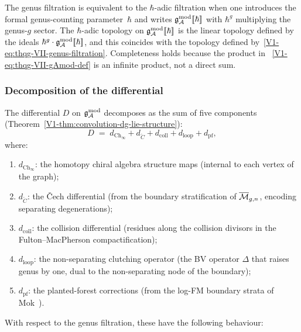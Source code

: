 \begin{remark}
\label{rem:thqg-VII-hbar-topology}
The genus filtration is equivalent to the $\hbar$-adic filtration
when one introduces the formal genus-counting parameter~$\hbar$
and writes $\mathfrak{g}_{\mathcal{A}}^{\mathrm{mod}}[\![\hbar]\!]$ with $\hbar^g$ multiplying the
genus-$g$ sector. The $\hbar$-adic topology on
$\mathfrak{g}_{\mathcal{A}}^{\mathrm{mod}}[\![\hbar]\!]$ is the linear topology defined by the
ideals $\hbar^g \cdot \mathfrak{g}_{\mathcal{A}}^{\mathrm{mod}}[\![\hbar]\!]$, and this coincides
with the topology defined by~\eqref{V1-eq:thqg-VII-genus-filtration}.
Completeness holds because the product in~%
\eqref{V1-eq:thqg-VII-gAmod-def} is an infinite product, not
a direct sum.
\end{remark}

\subsubsection{Decomposition of the differential}

The differential $D$ on $\mathfrak{g}_{\mathcal{A}}^{\mathrm{mod}}$ decomposes as the sum of
five components
(Theorem~\ref{V1-thm:convolution-dg-lie-structure}):
\begin{equation}%
D \;=\; d_{\mathrm{Ch}_\infty}
 + d_{\check{C}}
 + d_{\mathrm{coll}}
 + d_{\mathrm{loop}}
 + d_{\mathrm{pf}},
\end{equation}
where:
\begin{enumerate}[label=(\roman*)]
\item $d_{\mathrm{Ch}_\infty}$: the homotopy chiral algebra
 structure maps (internal to each vertex of the graph);
\item $d_{\check{C}}$: the \v{C}ech differential (from the
 boundary stratification of $\overline{\mathcal{M}}_{g,n}$, encoding
 separating degenerations);
\item $d_{\mathrm{coll}}$: the collision differential (residues
 along the collision divisors in the Fulton--MacPherson
 compactification);
\item $d_{\mathrm{loop}}$: the non-separating clutching operator
 (the BV operator $\Delta$ that raises genus by one, dual to
 the non-separating node of the boundary);
\item $d_{\mathrm{pf}}$: the planted-forest corrections
 (from the log-FM boundary strata of
 Mok~\cite{Mok25}).
\end{enumerate}
With respect to the genus filtration, these have the following
behaviour:

